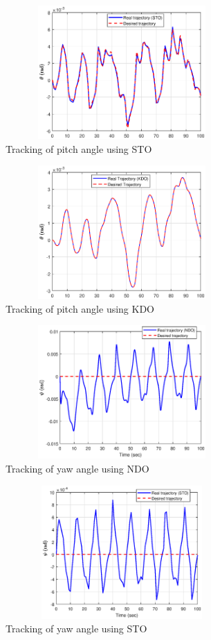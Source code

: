 \documentclass[letterpaper%
, twoside%
, 12pt%
,memoire%
, english%
,creativecommons,hyperref%
]{thETS}
\begin{document}
\begin{figure}[H]
\centering
\includegraphics[width=3.5in,height=2in]{Figures/results/tracking/pitch_trac_dis_m1_sto.eps}
\caption{Tracking of pitch angle using STO}
\label{pitch_trac_dis_m1_sto}
\end{figure}

\begin{figure}[H]
\centering
\includegraphics[width=3.5in,height=2in]{Figures/results/tracking/pitch_trac_dis_m1_kdo.eps}
\caption{Tracking of pitch angle using KDO}
\label{pitch_trac_dis_m1_kdo}
\end{figure}

\begin{figure}[H]
\centering
\includegraphics[width=3.5in,height=2in]{Figures/results/tracking/yaw_trac_dis_m1_ndo.eps}
\caption{Tracking of yaw angle using NDO}
\label{yaw_trac_dis_m1_ndo}
\end{figure}

\begin{figure}[H]
\centering
\includegraphics[width=3.5in,height=2in]{Figures/results/tracking/yaw_trac_dis_m1_sto.eps}
\caption{Tracking of yaw angle using STO}
\label{yaw_trac_dis_m1_sto}
\end{figure}
\end{document}
